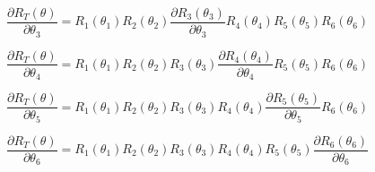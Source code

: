 \begin{equation}
\frac{\partial R_T(\theta)}{\partial \theta_3} = R_1(\theta_1)R_2(\theta_2) \frac{\partial R_3(\theta_3)}{\partial \theta_3} R_4(\theta_4)R_5(\theta_5)R_6(\theta_6)
\end{equation}

\begin{equation}
\frac{\partial R_T(\theta)}{\partial \theta_4} = R_1(\theta_1)R_2(\theta_2)R_3(\theta_3) \frac{\partial R_4(\theta_4)}{\partial \theta_4} R_5(\theta_5)R_6(\theta_6)
\end{equation}

\begin{equation}
\frac{\partial R_T(\theta)}{\partial \theta_5} = R_1(\theta_1)R_2(\theta_2)R_3(\theta_3)R_4(\theta_4) \frac{\partial R_5(\theta_5)}{\partial \theta_5} R_6(\theta_6)
\end{equation}

\begin{equation}
\frac{\partial R_T(\theta)}{\partial \theta_6} = R_1(\theta_1)R_2(\theta_2)R_3(\theta_3)R_4(\theta_4)R_5(\theta_5) \frac{\partial R_6(\theta_6)}{\partial \theta_6}
\end{equation}
